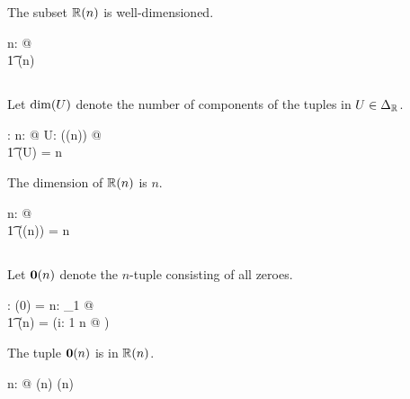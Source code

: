 \documentclass[11pt, oneside]{article}
\begin{document}
\begin{example}
The subset $\mathbb{R}(n)$ is well-dimensioned.

\begin{zed}
	\forall n: \nat @ \\
	\t1	\Rtuples(n) \in \DeltaR
\end{zed}

\end{example}

\subsection{}

Let $\operatorname{dim}(U)$ denote the number of components of the tuples in $U \in \Delta_{\mathbb{R}}$.

\begin{axdef}
	\dimR: \DeltaR \fun \nat
\where
	\forall n: \nat @ \forall U: \power(\Rtuples(n)) @ \\
	\t1	\dimR(U) = n
\end{axdef}

\begin{example}
The dimension of $\mathbb{R}(n)$ is $n$.

\begin{zed}
	\forall n: \nat @ \\
	\t1	\dimR(\Rtuples(n)) = n
\end{zed}

\end{example}

\subsection{}

Let $\mathbf{0}(n)$ denote the $n$-tuple consisting of all zeroes.

\begin{axdef}
	\zeroRn: \nat \fun \Rinf
\where
	\zeroRn(0) = \langle \rangle
\also
	\forall n: \nat_1 @ \\
	\t1	\zeroRn(n) = (\lambda i: 1 \upto n @ \zeroR)
\end{axdef}

\begin{remark}
The tuple $\mathbf{0}(n)$ is in $\mathbb{R}(n)$.

\begin{zed}
	\forall n: \nat @
		\zeroRn(n) \in \Rtuples(n)
\end{zed}

\end{remark}
\end{document}
